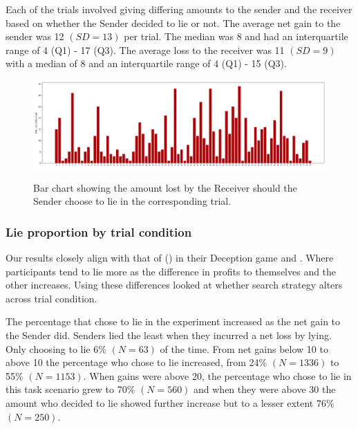 \documentclass[man, floatsintext]{apa7}
\begin{document}
Each of the trials involved giving differing amounts to the sender and the receiver based on whether the Sender decided to lie or not. The average net gain to the sender was 12 $(SD = 13)$ per trial. The median was 8 and had an interquartile range of 4 (Q1) - 17 (Q3). The average loss to the receiver was 11 $(SD = 9)$ with a median of 8 and an interquartile range of 4 (Q1) - 15 (Q3).

\begin{figure}[H]
	\caption{Bar chart showing the amount lost by the Receiver should the Sender choose to lie in the corresponding trial.}
	\includegraphics[width=\linewidth]{../plots/TrialIndex/Losses.png}
	\label{fig:Losses}
\end{figure}

\subsubsection{Lie proportion by trial condition}

Our results closely align with that of  \citeauthor{gneezyDeceptionRoleConsequences2005} (\citeyear{gneezyDeceptionRoleConsequences2005}) in their Deception game and \citeauthor{shusterContributionSelfOtherregarding2020}. Where participants tend to lie more as the difference in profits to themselves and the other increases. Using these differences looked at whether search strategy alters across trial condition.

The percentage that chose to lie in the experiment increased as the net gain to the Sender did.  Senders lied the least when they incurred a net loss by lying. Only choosing to lie 6\% $(N = 63)$ of the time. From net gains below 10 to above 10 the percentage who chose to lie increased, from 24\% $(N = 1336)$ to 55\% $(N = 1153)$. When gains were above 20, the percentage who chose to lie in this task scenario grew to 70\% $(N = 560)$ and when they were above 30 the amount who decided to lie showed further increase but to a lesser extent 76\% $(N = 250)$.
\end{document}
